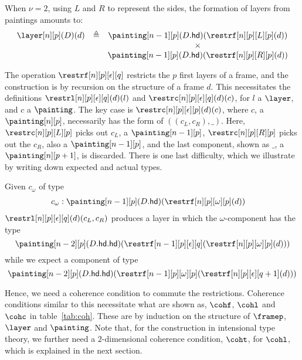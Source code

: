 \documentclass{msc}
\newcommand{\defeq}{\ensuremath{\triangleq}}
\newcommand{\hd}{\ensuremath{\mathsf{hd}}}
\begin{document}
When $\nu = 2$, using $L$ and $R$ to represent the sides, the formation of layers from paintings amounts to:
\begin{equation*}
  \begin{array}{llc}
    \layer[n][p](D)(d) & \defeq & \painting[n-1][p](D.\hd)(\restrf[n][p][L][p](d)) \\
                       &        & \times                                           \\
                       &        & \painting[n-1][p](D.\hd)(\restrf[n][p][R][p](d))
  \end{array}
\end{equation*}

The operation $\restrf[n][p][\epsilon][q]$ restricts the $p$ first layers of a frame, and the construction is by recursion on the structure of a frame $d$. This necessitates the definitions $\restrl[n][p][\epsilon][q](d)(l)$ and $\restrc[n][p][\epsilon][q](d)(c)$, for $l$ a $\layer$, and $c$ a $\painting$. The key case is $\restrc[n][p][\epsilon][p](d)(c)$, where $c$, a $\painting[n][p]$, necessarily has the form of $((c_L, c_R), \_)$. Here, $\restrc[n][p][L][p]$ picks out $c_L$, a $\painting[n-1][p]$, $\restrc[n][p][R][p]$ picks out the $c_R$, also a $\painting[n-1][p]$, and the last component, shown as $\_$, a $\painting[n][p+1]$, is discarded. There is one last difficulty, which we illustrate by writing down expected and actual types.

Given $c_\omega$ of type
\begin{align*}
  c_\omega & : \painting[n-1][p](D.\hd)(\restrf[n][p][\omega][p](d))
\end{align*}
$\restrl[n][p][\epsilon][q](d)(c_L, c_R)$ produces a layer in which the $\omega$-component has the type
\begin{equation*}
  \painting[n-2][p](D.\hd.\hd)(\restrf[n-1][p][\epsilon][q](\restrf[n][p][\omega][p](d)))
\end{equation*}
while we expect a component of type
\begin{equation*}
  \painting[n-2][p](D.\hd.\hd)(\restrf[n-1][p][\omega][p](\restrf[n][p][\epsilon][q+1](d)))
\end{equation*}

Hence, we need a coherence condition to commute the restrictions. Coherence conditions similar to this necessitate what are shown as, $\cohf$, $\cohl$ and $\cohc$ in table~\ref{tab:coh}. These are by induction on the structure of $\framep$, $\layer$ and $\painting$. Note that, for the construction in intensional type theory, we further need a $2$-dimensional coherence condition, $\coht$, for $\cohl$, which is explained in the next section.
\end{document}
